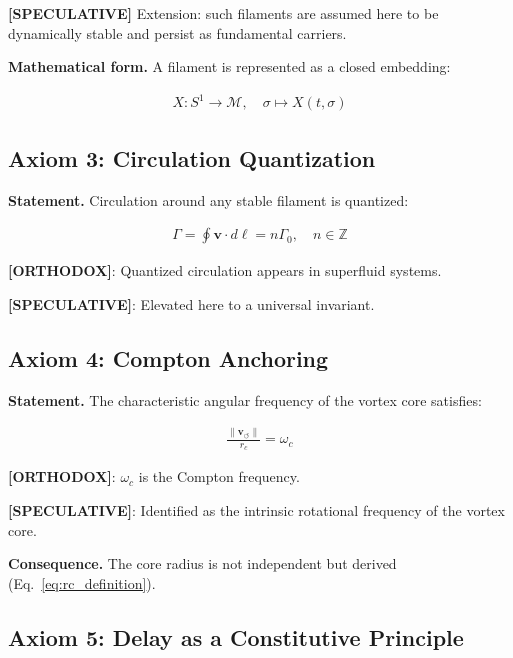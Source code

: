 \documentclass[11pt]{article}
\theoremstyle{definition}
\theoremstyle{plain}
\theoremstyle{remark}
\newcommand{\rc}{{r_c}}
\newcommand{\vnorm}{\lVert \mathbf{v}_{\!\boldsymbol{\circlearrowleft}} \rVert}
\begin{document}
        \textbf{[SPECULATIVE]} Extension: such filaments are assumed here to be dynamically stable and persist as fundamental carriers.
        
        \textbf{Mathematical form.}
        A filament is represented as a closed embedding:
        
        \begin{align}
            X: S^1 \to \mathcal{M}, \quad \sigma \mapsto X(t,\sigma)
        \end{align}
    
    \subsection{Axiom 3: Circulation Quantization}
        
        \textbf{Statement.}
        Circulation around any stable filament is quantized:
        
        \begin{align}
            \Gamma = \oint \mathbf{v} \cdot d\ell = n \Gamma_0, \quad n \in \mathbb{Z}
        \end{align}
        
        \textbf{[ORTHODOX]}: Quantized circulation appears in superfluid systems.
        
        \textbf{[SPECULATIVE]}: Elevated here to a universal invariant.
    
    \subsection{Axiom 4: Compton Anchoring}
        
        \textbf{Statement.}
        The characteristic angular frequency of the vortex core satisfies:
        
        \begin{align}
            \frac{\vnorm}{\rc} = \omega_c
        \end{align}
        
        \textbf{[ORTHODOX]}: $\omega_c$ is the Compton frequency.
        
        \textbf{[SPECULATIVE]}: Identified as the intrinsic rotational frequency of the vortex core.
        
        \textbf{Consequence.}
        The core radius is not independent but derived (Eq.~\ref{eq:rc_definition}).
    
    \subsection{Axiom 5: Delay as a Constitutive Principle}
        
\end{document}
